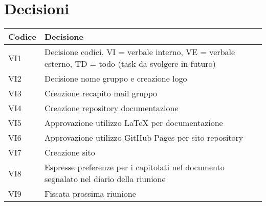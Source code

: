 \section{Decisioni}

	\begin{table}[htbp]
		\begin{tabular}{|p{}|p{}|}
			\hline
			\rowcolor[gray]{0.9}
			Codice & Decisione \\
			\hline
			VI1 & Decisione codici. VI = verbale interno, VE = verbale esterno, TD = todo (task da svolgere in futuro) \\
			\hline
			VI2	& Decisione nome gruppo e creazione logo \\
			\hline
			VI3 & Creazione recapito mail gruppo \\
			\hline
			VI4 & Creazione repository documentazione \\
			\hline
			VI5	& Approvazione utilizzo LaTeX per documentazione \\
			\hline
			VI6 & Approvazione utilizzo GitHub Pages per sito repository \\
			\hline
			VI7 & Creazione sito \\
			\hline
			VI8 & Espresse preferenze per i capitolati nel documento segnalato nel diario della riunione \\
			\hline
			VI9 & Fissata prossima riunione \\
			\hline
		\end{tabular}
	\end{table}